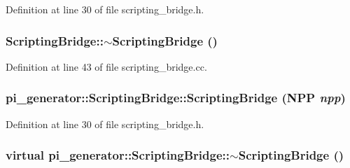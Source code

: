 Definition at line 30 of file scripting\_\-bridge.h.

\hypertarget{classpi__generator_1_1_scripting_bridge_ae6c311b5f9ffa0a578c7d8e41fa9c23c}{
\subsubsection[{$\sim$ScriptingBridge}]{\setlength{\rightskip}{0pt plus 5cm}ScriptingBridge::$\sim$ScriptingBridge ()}}
\label{classpi__generator_1_1_scripting_bridge_ae6c311b5f9ffa0a578c7d8e41fa9c23c}


Definition at line 43 of file scripting\_\-bridge.cc.

\hypertarget{classpi__generator_1_1_scripting_bridge_abcc778b6a4c482dff1ed271d7e776e42}{
\subsubsection[{ScriptingBridge}]{\setlength{\rightskip}{0pt plus 5cm}pi\_\-generator::ScriptingBridge::ScriptingBridge (NPP {\em npp})}}
\label{classpi__generator_1_1_scripting_bridge_abcc778b6a4c482dff1ed271d7e776e42}


Definition at line 30 of file scripting\_\-bridge.h.

\hypertarget{classpi__generator_1_1_scripting_bridge_a59851d3f9406541b0805b87b874a1a49}{
\subsubsection[{$\sim$ScriptingBridge}]{\setlength{\rightskip}{0pt plus 5cm}virtual pi\_\-generator::ScriptingBridge::$\sim$ScriptingBridge ()}}
\label{classpi__generator_1_1_scripting_bridge_a59851d3f9406541b0805b87b874a1a49}


